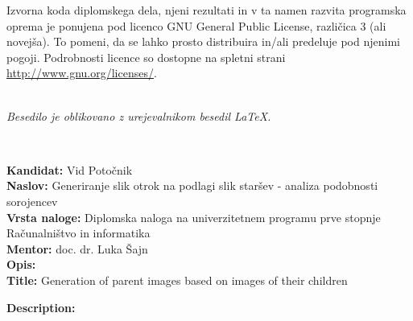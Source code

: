 \documentclass[a4paper,12pt,openright]{book}
\newcommand{\clearemptydoublepage}{\newpage{\pagestyle{empty}\cleardoublepage}}
\begin{document}
\vspace*{1cm}
{\small \noindent
Izvorna koda diplomskega dela, njeni rezultati in v ta namen razvita programska oprema je ponujena pod licenco GNU General Public License,
različica 3 (ali novejša). To pomeni, da se lahko prosto distribuira in/ali predeluje pod njenimi pogoji.
Podrobnosti licence so dostopne na spletni strani \url{http://www.gnu.org/licenses/}.
}

\vfill
\begin{center} 
\ \\ \vfill
{\em
Besedilo je oblikovano z urejevalnikom besedil \LaTeX.}
\end{center}

\clearemptydoublepage

\thispagestyle{empty}
\
\vfill

\bigskip
\noindent\textbf{Kandidat:} Vid Potočnik    \\
\noindent\textbf{Naslov:} Generiranje slik otrok na podlagi slik staršev - analiza podobnosti sorojencev\\
\noindent\textbf{Vrsta naloge:} Diplomska naloga na univerzitetnem programu prve stopnje Računalništvo in informatika \\
\noindent\textbf{Mentor:} doc. dr. Luka Šajn\\


\bigskip
\noindent\textbf{Opis:}\\


\bigskip
\noindent\textbf{Title:} Generation of parent images based on images of their children

\bigskip
\noindent\textbf{Description:}\\

\vfill



\vspace{2cm}




\end{document}
